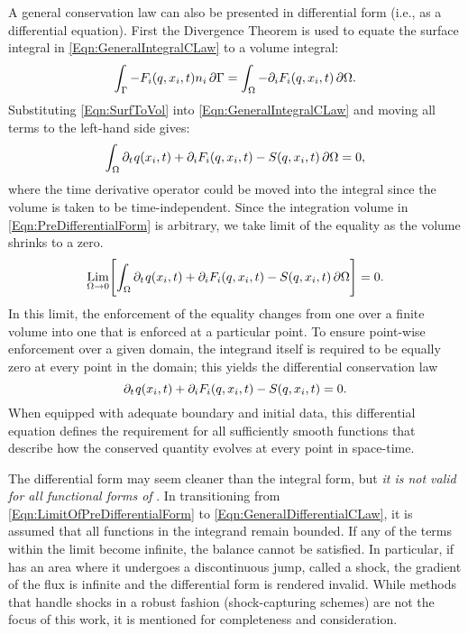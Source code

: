 \documentclass[12pt]{../UWMadThesis}
\begin{document}
A general conservation law can also be presented in differential form (i.e., as a differential equation).
First the Divergence Theorem is used to equate the surface integral in \cref{Eqn:GeneralIntegralCLaw} to a volume integral:
\begin{equation}
    \int_{\Gamma} -F_i(q,x_i,t) n_i\,\partial\Gamma = \int_{\Omega} - \partial_i F_i(q,x_i,t) \,\partial\Omega.
    \label{Eqn:SurfToVol}
\end{equation}
Substituting \cref{Eqn:SurfToVol} into \cref{Eqn:GeneralIntegralCLaw} and moving all terms to the left-hand side gives:
\begin{equation}%
    \IntV \pdt\q(x_i,t) + \pdi F_i(\q,x_i,t) - S(\q,x_i,t) \dV = 0,
    \label{Eqn:PreDifferentialForm}
\end{equation}
where the time derivative operator could be moved into the integral since the volume is taken to be time-independent.
Since the integration volume in \cref{Eqn:PreDifferentialForm} is arbitrary, we take limit of the equality as the volume shrinks to a zero.
\begin{equation}%
    \Lim_{\V \rightarrow 0}\Biggl[\IntV \pdt\q(x_i,t) + \pdi F_i(\q,x_i,t) - S(\q,x_i,t) \dV \Biggr]= 0.
    \label{Eqn:LimitOfPreDifferentialForm}
\end{equation}
In this limit, the enforcement of the equality changes from one over a finite volume into one that is enforced at a particular point.
To ensure point-wise enforcement over a given domain, the integrand itself is required to be equally zero at every point in the domain; this yields the differential conservation law
\begin{equation}
    \partial_t\:\!q(x_i,t) + \partial_i F_i(q,x_i,t) - S(q,x_i,t) = 0.
    \label{Eqn:GeneralDifferentialCLaw}
\end{equation}
When equipped with adequate boundary and initial data, this differential equation defines the requirement for all sufficiently smooth functions that describe how the conserved quantity evolves at every point in space-time.

The differential form may seem cleaner than the integral form, but \emph{it is not valid for all functional forms of \q{}}.
In transitioning from \cref{Eqn:LimitOfPreDifferentialForm} to \cref{Eqn:GeneralDifferentialCLaw}, it is assumed that all functions in the integrand remain bounded.
If any of the terms within the limit become infinite, the balance cannot be satisfied.
In particular, if \q{} has an area where it undergoes a discontinuous jump, called a shock, the gradient of the flux is infinite and the differential form is rendered invalid.
While methods that handle shocks in a robust fashion (shock-capturing schemes) are not the focus of this work, it is mentioned for completeness and consideration.
\end{document}
